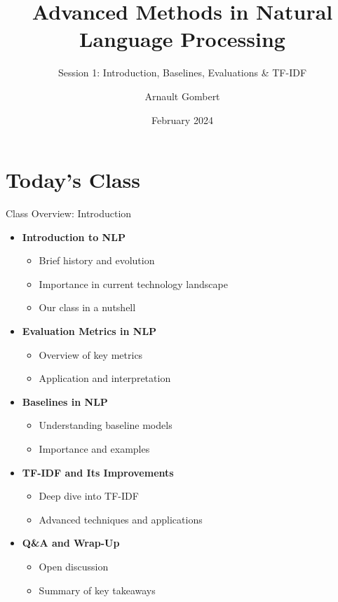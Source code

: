 \documentclass{beamer}
\title{Advanced Methods in Natural Language Processing}
\subtitle{Session 1: Introduction, Baselines, Evaluations \& TF-IDF}
\author[Arnault Gombert]{Arnault Gombert}
\institute[shortinst]{Barcelona School of Economics}
\date{February 2024}
\begin{document}
\begin{frame}
\titlepage %
\end{frame}



\section{Today's Class}

\begin{frame}{Class Overview: Introduction}

\begin{itemize}
  \item \textbf{Introduction to NLP}
    \begin{itemize}
      \item Brief history and evolution
      \item Importance in current technology landscape
      \item Our class in a nutshell
    \end{itemize}
  \item \textbf{Evaluation Metrics in NLP}
    \begin{itemize}
      \item Overview of key metrics
      \item Application and interpretation
    \end{itemize}
  \item \textbf{Baselines in NLP}
    \begin{itemize}
      \item Understanding baseline models
      \item Importance and examples
    \end{itemize}
  \item \textbf{TF-IDF and Its Improvements}
    \begin{itemize}
      \item Deep dive into TF-IDF
      \item Advanced techniques and applications
    \end{itemize}
  \item \textbf{Q\&A and Wrap-Up}
    \begin{itemize}
      \item Open discussion
      \item Summary of key takeaways
    \end{itemize}
\end{itemize}

\end{frame}
\end{document}
